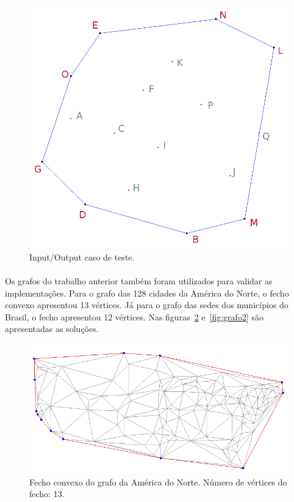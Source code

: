 \documentclass[11pt,a4paper]{article}
\begin{document}
\begin{figure}[htb]
\begin{minipage}[b]{0.4\textwidth}
                  \includegraphics[width=.9\linewidth]{test_sample_ch}
                \end{minipage}
                \caption{Input/Output caso de teste.}
                \label{fig:sample}
        \end{figure}


    \paragraph{}
    Os grafos do trabalho anterior também foram utilizados para validar as implementações. Para o grafo das 128 cidades da América do Norte, o fecho convexo apresentou 13 vértices. Já para o grafo das sedes dos municípios do Brasil, o fecho apresentou 12 vértices. Nas figuras~\ref{fig:grafo1} e~\ref{fig:grafo2} são apresentadas as soluções.

        \begin{figure}[!htb]
          \begin{center}
              \includegraphics[scale=0.5]{america_ch}
          \end{center}
                \captionsetup{justification=centering,margin=2cm}
              \caption{Fecho convexo do grafo da América do Norte. Número de vértices do fecho: 13.}
              \label{fig:grafo1}
        \end{figure}
\end{document}
